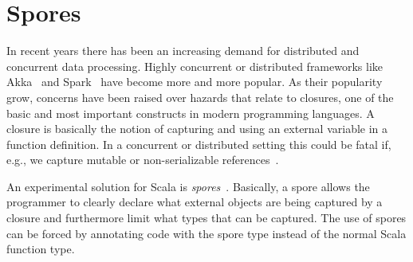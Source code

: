 
\section{Spores}\label{sec:spores}

In recent years there has been an increasing demand for distributed and
concurrent data processing. Highly concurrent or distributed frameworks like
Akka~\parencite{akka} and Spark~\parencite{spark} have become more and more
popular. As their popularity grow, concerns have been raised over hazards that
relate to closures, one of the basic and most important constructs in modern
programming languages. A closure is basically the notion of capturing and using
an external variable in a function definition. In a concurrent or distributed
setting this could be fatal if, e.g., we capture mutable or non-serializable
references~\parencite{conf/ecoop/MillerHO14}. 

An experimental solution for Scala is
\emph{spores}~\parencite{conf/ecoop/MillerHO14}. Basically, a spore allows the
programmer to clearly declare what external objects are being captured by a
closure and furthermore limit what types that can be captured. The use of spores
can be forced by annotating code with the spore type instead of the normal
Scala function type. 




